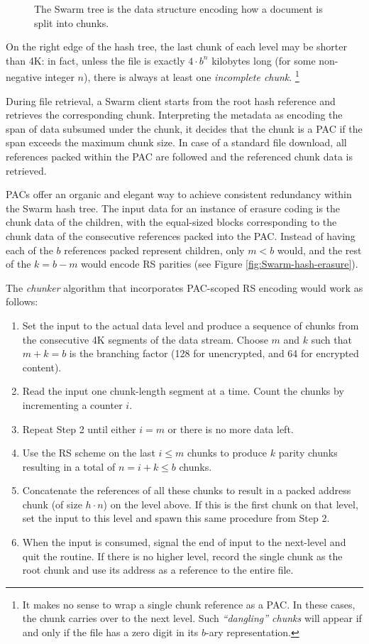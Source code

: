 \documentclass[manuscript,screen,review]{acmart}
\begin{document}
\begin{figure}[!ht]
   \centering
   
   \caption[Swarm hash split]{The Swarm tree is the data structure encoding how a document is split into chunks.}
   \label{fig:Swarm-hash-split}
\end{figure}

On the right edge of the hash tree, the last chunk of each level may be shorter than 4K: in fact, unless the file is exactly $4\cdot b^n$ kilobytes long (for some non-negative integer $n$), there is always at least one \emph{incomplete chunk}.%
%
\footnote{It makes no sense to wrap a single chunk reference as a PAC. In these cases, the chunk carries over to the next level. Such \emph{``dangling'' chunks} will appear if and only if the file has a zero digit in its $b$-ary representation.}

During file retrieval, a Swarm client starts from the root hash reference and retrieves the corresponding chunk. Interpreting the metadata as encoding the span of data subsumed under the chunk, it decides that the chunk is a PAC if the span exceeds the maximum chunk size.
In case of a standard file download, all references packed within the PAC are followed and the referenced chunk data is retrieved.

PACs offer an organic and elegant way to achieve consistent redundancy within the Swarm hash tree.
The input data for an instance of erasure coding is the chunk data of the children, with the equal-sized blocks corresponding to the chunk data of the consecutive references packed into the PAC. Instead of having each of the $b$ references packed represent children, only $m < b$ would, and the rest of the $k=b-m$ would encode RS parities (see Figure \ref{fig:Swarm-hash-erasure}).


The \emph{chunker} algorithm that incorporates PAC-scoped RS encoding would work as follows:
\begin{enumerate}[noitemsep]
\item Set the input to the actual data level and produce a sequence of chunks from the consecutive 4K segments of the data stream. Choose $m$ and $k$ such that $m+k=b$ is the branching factor (128 for unencrypted, and 64 for encrypted content).
\item Read the input one chunk-length segment at a time. Count the chunks by incrementing a counter $i$.
\item Repeat Step 2 until either $i = m$ or there is no more data left.
\item Use the RS scheme on the last $i\leq m$ chunks to produce $k$ parity chunks resulting in a total of $n = i+k \leq b$ chunks.
\item Concatenate the references of all these chunks to result in a packed address chunk (of size $h\cdot n$) on the level above. If this is the first chunk on that level, set the input to this level and spawn this same procedure from Step 2.
\item When the input is consumed, signal the end of input to the next-level and quit the routine. If there is no higher level, record the single chunk as the root chunk and use its address as a reference to the entire file.
\end{enumerate}
\end{document}
